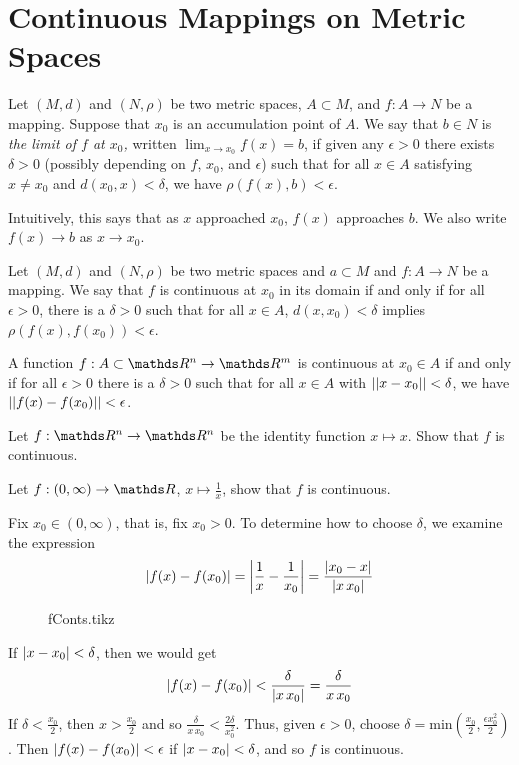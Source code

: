 \documentclass[../main-sheet.tex]{subfiles}
\begin{document}
\chapter{Continuous Mappings on Metric Spaces}
\begin{defn}
    Let $ (M,d) $ and $ (N,\rho) $ be two metric spaces, $ A\subset M $, and $ f:A\to N $ be a mapping. Suppose that $ x_0 $ is an accumulation point of $ A $. We say that $ b\in N $ is \emph{the limit of $ f $ at $ x_0$,} written $ \lim_{x\to x_0}f(x)=b $, if given any $ \epsilon>0 $ there exists $ \delta >0 $ (possibly depending on $ f $, $ x_0 $, and $ \epsilon $) such that for all $ x\in A $ satisfying $ x\neq x_0 $ and $ d(x_0,x)<\delta $, we have $ \rho\left( f(x),b \right)<\epsilon $.

    Intuitively, this says that as $ x $ approached $ x_0 $, $ f(x) $ approaches $ b $. We also write $ f(x)\longrightarrow b $ as $ x\longrightarrow x_0 $.
\end{defn}
\begin{defn}
    Let $ (M,d) $ and $ (N,\rho) $ be two metric spaces and $ a\subset M $ and $ f:A\to N $ be a mapping. We say that $ f $ is continuous at $ x_0 $ in its domain if and only if for all $ \epsilon>0 $, there is a $ \delta>0 $ such that for all $ x\in A $, $ d(x,x_0)<\delta $ implies $ \rho\left( f(x),f(x_0) \right)<\epsilon $.
\end{defn}
\begin{note}
    A function $ f:A\subset\R^n\to\R^m $ is continuous at $ x_0\in A $ if and only if for all $ \epsilon>0 $ there is a $ \delta>0 $ such that for all $ x\in A $ with $ \left\vert\left\vert x-x_0\right\vert\right\vert<\delta $, we have $ \left\vert\left\vert f(x)-f(x_0)\right\vert\right\vert<\epsilon $.
\end{note}
\begin{ex}[HW]
    Let $ f:\R^n\to\R^n $ be the identity function $ x\mapsto x $. Show that $ f $ is continuous.
\end{ex}
\begin{ex}
    Let $ f:(0,\infty)\to \R $, $ x\mapsto \frac{1}{x} $, show that $ f $ is continuous.
\end{ex}
\begin{soln}
    Fix $ x_0 \in (0,\infty)$, that is, fix $ x_0>0 $. To determine how to choose $ \delta $, we examine the expression
    \[
        \left\vert f(x)-f(x_0)\right\vert=\left\vert\frac{1}{x}-\frac{1}{x_0}\right\vert=\frac{\left\vert x_0-x\right\vert}{\left\vert x\,x_0\right\vert}
    \]
    \begin{figure}[H]
        \centering
        {fConts.tikz}
    \end{figure}
    If $ \left\vert x-x_0\right\vert<\delta $, then we would get
    \[
        \left\vert f(x)-f(x_0)\right\vert<\frac{\delta}{\left\vert x\,x_0\right\vert}=\frac{\delta}{x\,x_0}
    \]
    If $ \delta<\frac{x_0}{2} $, then $ x>\frac{x_0}{2} $ and so $ \frac{\delta}{x\,x_0}<\frac{2\delta}{x_0^2} $. Thus, given $ \epsilon >0 $, choose $ \delta=\text{min}\left( \frac{x_0}{2},\frac{\epsilon x_0^2}{2} \right) $. Then $ \left\vert f(x)-f(x_0)\right\vert<\epsilon $ if $ \left\vert x-x_0\right\vert<\delta $, and so $ f $ is continuous.
\end{soln}
\end{document}

